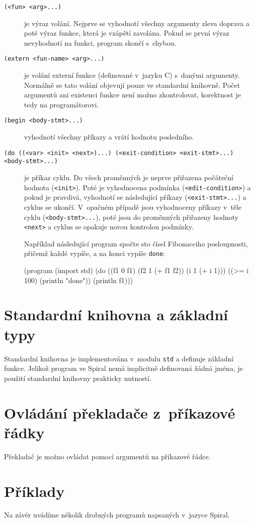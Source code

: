 \begin{description}
  \item[\texttt{(<fun> <arg>...)}] je výraz volání. Nejprve se vyhodnotí
    všechny argumenty zleva doprava a poté výraz funkce, která je vzápětí
    zavolána. Pokud se první výraz nevyhodnotí na funkci, program skončí s~chybou.

  \item[\texttt{(extern <fun-name> <arg>...)}] je volání externí funkce
    (definované v~jazyku C) s~danými argumenty. Normálně se tato volání objevují
    pouze ve standardní knihovně. Počet argumentů ani existenci funkce není
    možno zkontrolovat, korektnost je tedy na programátorovi.

  \item[\texttt{(begin <body-stmt>...)}] vyhodnotí všechny příkazy a vrátí
    hodnotu posledního.

  \item[\texttt{(do ((<var> <init> <next>)...) (<exit-condition> <exit-stmt>...)
    <body-stmt>...)}] je příkaz cyklu. Do všech proměnných je neprve přiřazena
    počáteční hodnota (\texttt{<init>}). Poté je vyhodnocena podmínka
    (\texttt{<edit-condition>}) a pokud je pravdivá, vyhodnotí se následující
    příkazy (\texttt{<exit-stmt>...}) a cyklus se ukončí. V~opačném případě jsou
    vyhodnoceny příkazy v~těle cyklu (\texttt{<body-stmt>...}), poté jsou do
    proměnných přiřazeny hodnoty \texttt{<next>} a cyklus se opakuje novou
    kontrolou podmínky.

    Například následující program spočte sto čísel Fibonacciho posloupnosti,
    přičemž každé vypíše, a na konci vypíše \texttt{done}:

\begin{spiral}
(program
  (import std)
  (do ((f1 0 f1)
       (f2 1 (+ f1 f2))
       (i  1 (+ i 1)))
    ((>= i 100)
      (println "done"))
    (println f1)))
\end{spiral}
\end{description}

\section{Standardní knihovna a základní typy}

Standardní knihovna je implementována v~modulu \texttt{std} a definuje základní
funkce. Jelikož program ve Spiral nemá implicitně definovaná žádná jména, je
použití standardní knihovny prakticky nutností.

\section{Ovládání překladače z~příkazové řádky}

Překladač je možno ovládat pomocí argumentů na příkazové řádce.

\section{Příklady}

Na závěr uvádíme několik drobných programů napsaných v~jazyce Spiral.
